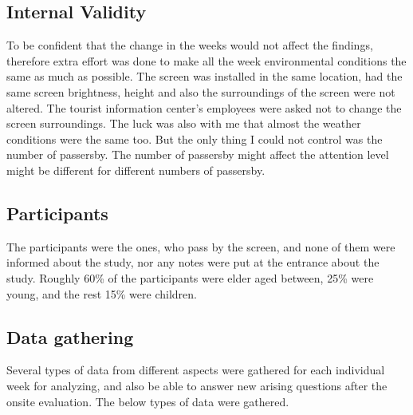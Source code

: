 \subsection{Internal Validity}
To be confident that the change in the weeks would not affect the findings, therefore extra effort was done to make all the week environmental conditions the same as much as possible. The screen was installed in the same location, had the same screen brightness, height and also the surroundings of the screen were not altered. The tourist information center's employees were asked not to change the screen surroundings. The luck was also with me that almost the weather conditions were the same too. But the only thing I could not control was the number of passersby. The number of passersby might affect the attention level might be different for different numbers of passersby.



\subsection{Participants}
The participants were the ones, who pass by the screen, and none of them were informed about the study, nor any notes were put at the entrance about the study. Roughly 60\% of the participants were elder aged between, 25\% were young, and the rest 15\% were children.

\subsection{Data gathering}
Several types of data from different aspects were gathered for each individual week for analyzing, and also be able to answer new arising questions after the onsite evaluation. The below types of data were gathered.

